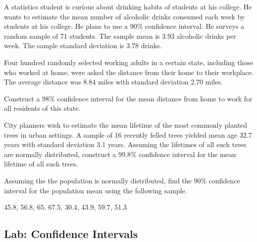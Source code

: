 \begin{exercise}

A statistics student is curious about drinking habits of students at his
college. He wants to estimate the mean number of alcoholic drinks
consumed each week by students at his college. He plans to use a 90\%
confidence interval. He surveys a random sample of 71 students. The
sample mean is 3.93 alcoholic drinks per week. The sample standard
deviation is 3.78 drinks.

\end{exercise}
\vspace*{8\baselineskip}

\begin{exercise}

Four hundred randomly selected working adults in a certain state,
including those who worked at home, were asked the distance from their
home to their workplace. The average distance was 8.84 miles with
standard deviation 2.70 miles.

Construct a 98\% confidence interval for the mean distance from home to
work for all residents of this state.

\end{exercise}
\vspace*{8\baselineskip}

\begin{exercise}

City planners wish to estimate the mean lifetime of the most commonly
planted trees in urban settings. A sample of 16 recently felled trees
yielded mean age 32.7 years with standard deviation 3.1 years. Assuming
the lifetimes of all such trees are normally distributed, construct a
99.8\% confidence interval for the mean lifetime of all such trees.

\end{exercise}
\vspace*{8\baselineskip}

\begin{exercise}

Assuming the the population is normally distributed, find the 90\% confidence interval for the population mean using the following sample.

45.8, 56.8, 65, 67.5, 30.4, 43.9, 59.7, 51.3

\end{exercise}
\vspace*{8\baselineskip}

\hypertarget{lab-confidence-intervals}{%
\subsection{Lab: Confidence Intervals}\label{lab-confidence-intervals}}

